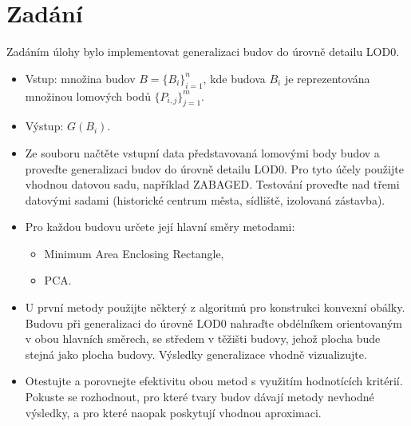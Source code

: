 \section{Zadání}

Zadáním úlohy bylo implementovat generalizaci budov do úrovně detailu LOD0.

\begin{itemize}
\item Vstup: množina budov \( B = \{B_i\}_{i=1}^n \), kde budova \( B_i \) je reprezentována množinou lomových bodů \( \{P_{i,j}\}_{j=1}^m \).
\item Výstup: \( G(B_i) \).

\item Ze souboru načtěte vstupní data představovaná lomovými body budov a proveďte generalizaci budov do úrovně detailu LOD0. Pro tyto účely použijte vhodnou datovou sadu, například ZABAGED. Testování proveďte nad třemi datovými sadami (historické centrum města, sídliště, izolovaná zástavba).

\item Pro každou budovu určete její hlavní směry metodami:
    \begin{itemize}
        \item Minimum Area Enclosing Rectangle,
        \item PCA.
    \end{itemize}

\item U první metody použijte některý z algoritmů pro konstrukci konvexní obálky. Budovu při generalizaci do úrovně LOD0 nahraďte obdélníkem orientovaným v obou hlavních směrech, se středem v těžišti budovy, jehož plocha bude stejná jako plocha budovy. Výsledky generalizace vhodně vizualizujte.

\item Otestujte a porovnejte efektivitu obou metod s využitím hodnotících kritérií. Pokuste se rozhodnout, pro které tvary budov dávají metody nevhodné výsledky, a pro které naopak poskytují vhodnou aproximaci.
\end{itemize}
